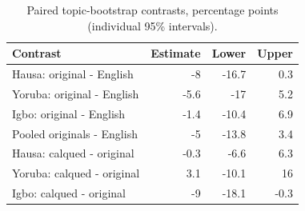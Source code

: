 \begin{table}[htbp]
\centering
\caption{Paired topic-bootstrap contrasts, percentage points (individual 95\% intervals).}
\small
\begin{tabular}{lrrr}
\toprule
Contrast & Estimate & Lower & Upper \\
\midrule
Hausa: original - English & -8 & -16.7 & 0.3 \\
Yoruba: original - English & -5.6 & -17 & 5.2 \\
Igbo: original - English & -1.4 & -10.4 & 6.9 \\
Pooled originals - English & -5 & -13.8 & 3.4 \\
Hausa: calqued - original & -0.3 & -6.6 & 6.3 \\
Yoruba: calqued - original & 3.1 & -10.1 & 16 \\
Igbo: calqued - original & -9 & -18.1 & -0.3 \\
\bottomrule
\end{tabular}
\end{table}
